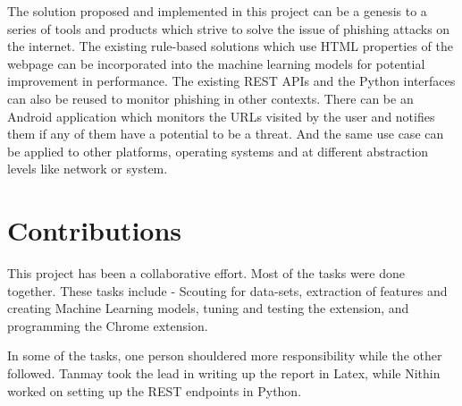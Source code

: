 \documentclass[conference]{IEEEtran}
\begin{document}
\par The solution proposed and implemented in this project can be a genesis to a series of tools and products which strive to solve the issue of phishing attacks on the internet.
The existing rule-based solutions which use HTML properties of the webpage can be incorporated into the machine learning models for potential improvement in performance.
The existing REST APIs and the Python interfaces can also be reused to monitor phishing in other contexts.
There can be an Android application which monitors the URLs visited by the user and notifies them if any of them have a potential to be a threat.
And the same use case can be applied to other platforms, operating systems and at different abstraction levels like network or system.


\section{Contributions}
This project has been a collaborative effort. Most of the tasks were done together. These tasks include - Scouting for data-sets, extraction of features and creating Machine Learning models, tuning and testing the extension, and programming the Chrome extension.

In some of the tasks, one person shouldered more responsibility while the other followed. Tanmay took the lead in writing up the report in Latex, while Nithin worked on setting up the REST endpoints in Python.



\end{document}
